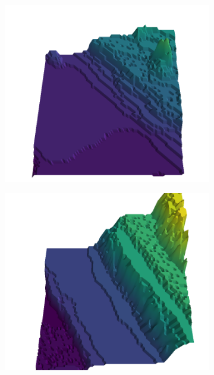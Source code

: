 \documentclass[../document.tex]{subfiles}
\begin{document}
\begin{figure}[H]
    \begin{subfigure}[b]{0.19\textwidth}
        \includegraphics[width=\linewidth]{../img/5/quarry/worst//patch-3d-majavi-colormap-0.png}
    \end{subfigure}
    \begin{subfigure}[b]{0.19\textwidth}
        \includegraphics[width=\linewidth]{../img/5/quarry/worst//patch-3d-majavi-colormap-1.png}
    \end{subfigure}  

\end{figure}
\end{document}
